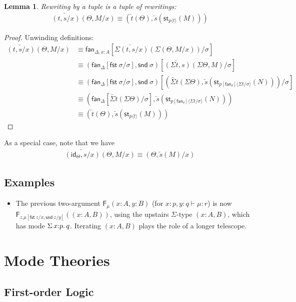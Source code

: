 \documentclass[10pt]{article}
\newtheorem{lemma}{Lemma}
\theoremstyle{definition}
\newcommand\dsd[1]{\ensuremath{\mathsf{#1}}}
\newcommand{\rewrite}[2]{\overleftarrow{#1}(#2)}
\newcommand\F[2]{\ensuremath{\mathsf{F}_{#1}(#2)}}
\newcommand\StI[2]{\ensuremath{\mathsf{st}_{#1}(#2)}}
\newcommand\fan[1]{\ensuremath{\mathsf{fan}_{#1}}}
\newcommand{\id}{\mathsf{id}}
\newcommand\ap[2]{\ensuremath{#1 \langle #2 \rangle }}
\newcommand{\app}[2]{\ensuremath{#1 \: #2}}
\newcommand{\sigmacl}[3]{\ensuremath{\textnormal{$\Sigma$}\,#1{:}#2.\,#3}}
\newcommand{\fst}[1]{\app{\dsd{fst}}{#1}}
\newcommand{\snd}[1]{\app{\dsd{snd}}{#1}}
\newcommand{\telety}[3]{\ensuremath{(#1{:}#2,#3)}}
\begin{document}
\begin{lemma}
Rewriting by a tuple is a tuple of rewritings:
\begin{align*}
\rewrite{(t, s/x)}{\Theta, M/x} \equiv (\rewrite{t}{\Theta}, \rewrite{s}{\StI{\ap{p}{t}}{M}})
\end{align*}
\end{lemma}
\begin{proof}
Unwinding definitions:
\begin{align*}
\rewrite{(t, s/x)}{\Theta, M/x}
&\equiv \fan{\Delta, x : A}[\rewrite{\Sigma (t, s/x)}{\Sigma (\Theta, M/x)}/\sigma] \\
&\equiv (\fan\Delta[\fst{\sigma}/\sigma], \snd{\sigma})[\rewrite{(\Sigma t, s)}{\Sigma\Theta, M}/\sigma] \\
&\equiv (\fan\Delta[\fst{\sigma}/\sigma], \snd{\sigma})[(\rewrite{\Sigma t}{\Sigma\Theta}, \rewrite{s}{\StI{\ap{p[\fan{\delta}]}{\Sigma t/\sigma}}{N}})/\sigma] \\
&\equiv (\fan\Delta[\rewrite{\Sigma t}{\Sigma\Theta}/\sigma], \rewrite{s}{\StI{\ap{p[\fan{\delta}]}{\Sigma t/\sigma}}{N}}) \\
&\equiv (\rewrite{t}{\Theta}, \rewrite{s}{\StI{\ap{p}{t}}{M}})
\end{align*}
\end{proof}

As a special case, note that we have
\begin{align*}
\rewrite{(\id_\Theta, s/x)}{\Theta, M/x} \equiv (\Theta, \rewrite{s}{M}/x)
\end{align*}

\subsection{Examples}

\begin{itemize}
\item 
The previous two-argument \F{\mu}{x:A,y:B} (for $x :p, y:q \vdash \mu :
r$) is now \F{z.\mu[\fst z/x,\snd z/y]}{\telety{x}{A}{B}}, using the
upstairs $\Sigma$-type ${\telety{x}{A}{B}}$, which has mode
$\sigmacl{x}{p}{q}$.  Iterating $\telety{x}{A}{B}$ plays the role of a
longer telescope.  
\end{itemize}

\section{Mode Theories}

\subsection{First-order Logic}
\end{document}
